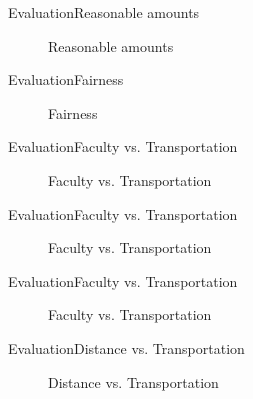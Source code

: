 \begin{frame}{Evaluation}{Reasonable amounts}
  \begin{figure}
    \centering
    
    \caption{Reasonable amounts}
  \end{figure}
\end{frame}

\begin{frame}{Evaluation}{Fairness}
  \begin{figure}
    \centering
    
    \caption{Fairness}
  \end{figure}
\end{frame}

\begin{frame}{Evaluation}{Faculty vs. Transportation}
  \begin{figure}
    \centering
    
    \caption{Faculty vs. Transportation}
  \end{figure}
\end{frame}

\begin{frame}{Evaluation}{Faculty vs. Transportation}
  \begin{figure}
    \centering
    
    \caption{Faculty vs. Transportation}
  \end{figure}
\end{frame}

\begin{frame}{Evaluation}{Faculty vs. Transportation}
  \begin{figure}
    \centering
    
    \caption{Faculty vs. Transportation}
  \end{figure}
\end{frame}

\begin{frame}{Evaluation}{Distance vs. Transportation}
  \begin{figure}
    \centering
    
    \caption{Distance vs. Transportation}
  \end{figure}
\end{frame}

